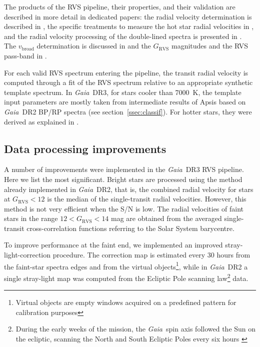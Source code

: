 \documentclass[longauth]{aa}
\providecommand{\vbroad}{\ensuremath{v_\mathrm{broad}}\xspace}
\providecommand{\bprp}{BP/RP\xspace}
\providecommand\grvs{\ensuremath{G_\mathrm{RVS}}\xspace}
\newcommand\gaia{\textit{Gaia}\xspace}
\providecommand\gdrtwo{\textit{Gaia}~DR2\xspace}
\providecommand\gdrthree{\textit{Gaia}~DR3\xspace}
\begin{document}
 The products of the RVS pipeline, their properties, and their validation are described in more detail in dedicated papers: the radial velocity determination is described in \citet{DR3-DPACP-159}, the specific treatments to measure the hot star radial velocities in \citet{DR3-DPACP-151}, and the radial velocity processing of the double-lined spectra is presented in  \citet{DR3-DPACP-161}.  The \vbroad  determination is discussed in \citet{DR3-DPACP-149} and the \grvs magnitudes and the RVS pass-band in \citet{DR3-DPACP-155}.
 
For each valid RVS spectrum  entering the pipeline, the transit radial velocity is computed through a fit of the RVS spectrum relative to an appropriate synthetic template spectrum. In \gdrthree, for stars  cooler than 7000~K, the template input parameters are mostly taken from intermediate results of Apsis \citep{DR3-DPACP-157}  based on \gdrtwo \bprp spectra (see section~\ref{ssec:classif}). For  hotter stars, they were derived as explained in \citet{DR3-DPACP-151}.

\subsection{ Data processing improvements}

A number of  improvements were implemented in the \gdrthree RVS pipeline. Here we list the most significant.  Bright stars are processed using the method already implemented  in \gdrtwo, that is, the combined radial velocity for stars at \grvs $< 12$ is the median of the single-transit radial velocities.
However, this method is not very efficient when the S/N is low. The radial velocities of  faint stars in the range  $12< \grvs<14 $ mag are obtained from the averaged  single-transit cross-correlation functions referring to the Solar System barycentre.

To improve performance at the faint end, we implemented an improved stray-light-correction procedure. The correction map is  estimated every 30 hours from the faint-star spectra edges and from the virtual objects\footnote{Virtual objects are empty windows acquired on a predefined pattern for calibration purposes}, while  in \gdrtwo a single stray-light map was computed from  the Ecliptic Pole scanning law\footnote{During the early weeks of the mission, the \gaia\  spin axis followed the Sun on the ecliptic, scanning the North and South Ecliptic Poles every six hours  \citep[see][Section 5.2]{DR1-DPACP-18}} data.
\end{document}
